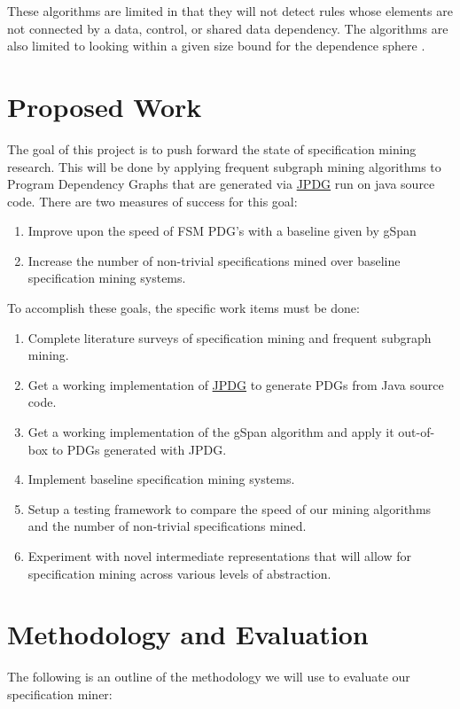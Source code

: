 \documentclass[12pt]{article}
\begin{document}
These algorithms are limited in that they will not detect rules whose elements are not connected by a data, control, or shared data dependency. The algorithms are also limited to looking within a given size bound for the dependence sphere \cite{DBLP:journals/smr/ChangP12}.

\section{Proposed Work}
The goal of this project is to push forward the state of specification mining research. This will be done by applying frequent subgraph mining algorithms to Program Dependency Graphs that are generated via \hyperref[subsection:JPDG]{JPDG} run on java source code. There are two measures of success for this goal:

\begin{enumerate}
    \item Improve upon the speed of FSM PDG's with a baseline given by gSpan
    \item Increase the number of non-trivial specifications mined over baseline specification mining systems.
\end{enumerate}

\noindent To accomplish these goals, the specific work items must be done:

\begin{enumerate}
    \item Complete literature surveys of specification mining and frequent subgraph mining.
    \item Get a working implementation of \hyperref[subsection:JPDG]{JPDG} to generate PDGs from Java source code.
    \item Get a working implementation of the gSpan algorithm and apply it out-of-box to PDGs generated with JPDG.
    \item Implement baseline specification mining systems.
    \item Setup a testing framework to compare the speed of our mining algorithms and the number of non-trivial specifications mined.
    \item Experiment with novel intermediate representations that will allow for specification mining across various levels of abstraction.
\end{enumerate}

\section{Methodology and Evaluation}
The following is an outline of the methodology we will use to evaluate our specification miner:
\end{document}
